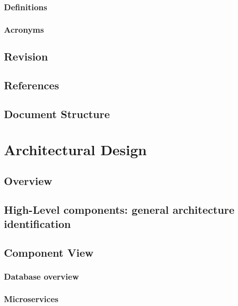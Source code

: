 \documentclass[12pt]{article}
\begin{document}
\subsubsection{Definitions}


\subsubsection{Acronyms}


\subsection{Revision}

\subsection{References}


\subsection{Document Structure}

\clearpage

\section{Architectural Design}

\subsection{Overview}

\subsection{High-Level components: general architecture identification}\label{higharch}

\subsection{Component View}\label{componentview}
\subsubsection{Database overview}

\subsubsection{Microservices}

\clearpage
\end{document}
